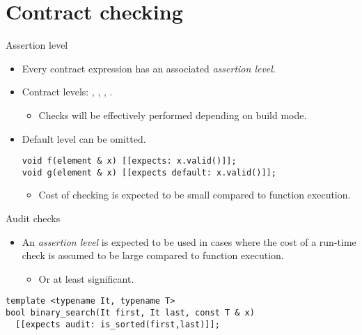 \section{Contract checking}

\begin{frame}[t,fragile]{Assertion level}
\begin{itemize}
  \item Every contract expression has an associated \emph{assertion level}.

  \vfill\pause
  \item Contract levels:
    ,
    ,
    ,
    .
    \begin{itemize}
      \item Checks will be effectively performed depending on build mode.
    \end{itemize}

  \vfill\pause
  \item Default level can be omitted.

\begin{lstlisting}
void f(element & x) [[expects: x.valid()]];
void g(element & x) [[expects default: x.valid()]];
\end{lstlisting}

  \vfill\pause
  \begin{itemize}
    \item Cost of  checking is expected to be small compared to function execution.
  \end{itemize}
\end{itemize}
\end{frame}

\begin{frame}[t,fragile]{Audit checks}
\begin{itemize}
  \item An  \emph{assertion level} is expected to be used in cases
where the cost of a run-time check is assumed to be large compared to function
execution.
    \begin{itemize}
      \item Or at least significant.
    \end{itemize}
\end{itemize}
\begin{lstlisting}
template <typename It, typename T>
bool binary_search(It first, It last, const T & x)
  [[expects audit: is_sorted(first,last)]];
\end{lstlisting}
\end{frame}

